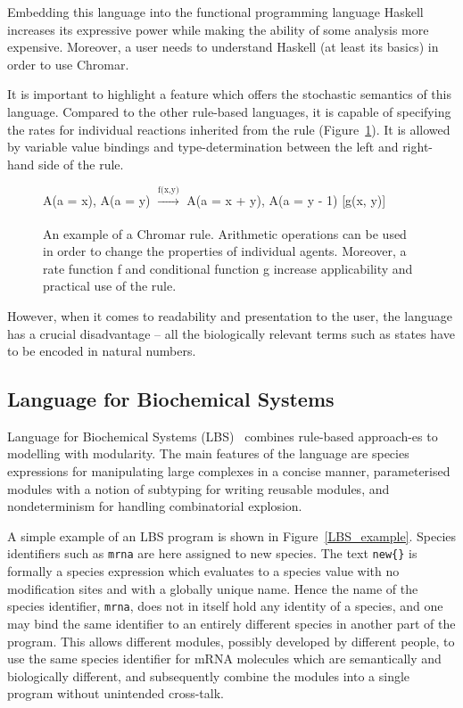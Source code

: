 \documentclass[11pt,a4paper]{report}
\begin{document}
Embedding this language into the functional programming language Haskell increases its expressive power while making the ability of some analysis more expensive. Moreover, a user needs to understand Haskell (at least its basics) in order to use Chromar.

It is important to highlight a feature which offers the stochastic semantics of this language. Compared to the other rule-based languages, it is capable of specifying the rates for individual reactions inherited from the rule (Figure~\ref{chromar_rule}). It is allowed by variable value bindings and type-determination between the left and right-hand side of the rule.

\begin{figure}[!h]
\begin{center}
A(a = x), A(a = y) $\xrightarrow[]{\text{f(x,y)}}$ A(a = x + y), A(a = y - 1) [g(x, y)]
\end{center}
\caption{An example of a Chromar rule. Arithmetic operations can be used in order to change the properties of individual agents. Moreover, a rate function f and conditional function g increase applicability and practical use of the rule.}\label{chromar-rule}\label{chromar_rule}
\end{figure}

However, when it comes to readability and presentation to the user, the language has a crucial disadvantage -- all the biologically relevant terms such as states have to be encoded in natural numbers.

\subsection{Language for Biochemical Systems}

Language for Biochemical Systems (LBS)~\cite{Pedersen} combines rule-based approach-es to modelling with modularity. The main features of the language are species expressions for manipulating large complexes in a concise manner, parameterised modules with a notion of subtyping for writing reusable modules, and nondeterminism for handling combinatorial explosion.

A simple example of an LBS program is shown in Figure~\ref{LBS_example}. Species identifiers such as \texttt{mrna} are here assigned to new species. The text \texttt{new\{\}} is formally a species expression which evaluates to a species value with no modification sites and with a globally unique name. Hence the name of the species identifier, \texttt{mrna}, does not in itself hold any identity of a species, and one may bind the same identifier to an entirely different species in another part of the program. This allows different modules, possibly developed by different people, to use the same species identifier for mRNA molecules which are semantically and biologically different, and subsequently combine the modules into a single program without unintended cross-talk.
\end{document}
